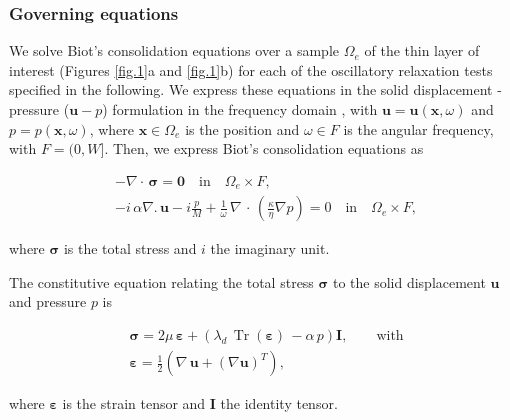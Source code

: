 \documentclass[draft]{agujournal2019}
\DeclareMathOperator{\tr}{Tr}
\begin{document}
\subsubsection{Governing equations}
We solve Biot's consolidation equations \cite{Biot1941, Biot1962} over a sample  $\Omega_e$ of the thin layer of interest (Figures \ref{fig.1}a and \ref{fig.1}b) for each of the oscillatory relaxation tests specified in the following. We express these equations in the solid displacement - pressure ($\bm{u}-p$) formulation in the frequency domain \cite{Quintal2011,Favino2020},  with $\bm{u} = \bm{u}(\bm{x}, \omega)$ and $p = p(\bm{x},\omega)$, where $\bm{x} \in \Omega_e$ is the position and $\omega \in F$ is the angular frequency, with $F =(0,W]$.
Then, we express Biot's consolidation equations as  
\begin{linenomath*}
\begin{equation}\label{Eq.6}
\begin{split}
& - \nabla \cdot \, \bm{\sigma} = \bm{0}  \quad  \textrm{in} \quad \Omega_e \times F,  \\
& - i \, \alpha \nabla . \, \bm{u} -i \frac{p}{M} + \frac{1}{\omega} \,\nabla \, \cdot \, \left( \frac{\kappa}{\eta} \nabla p\right)  =0 \quad  \textrm{in} \quad \Omega_e \times F,
\end{split}
\end{equation}
\end{linenomath*}
where $\bm{\sigma}$ is the total stress and $i$ the imaginary unit.

The constitutive equation relating the total stress $\bm{\sigma}$ to the solid displacement $\bm{u}$ and pressure $p$ is
\begin{linenomath*}
\begin{equation}\label{Eq.7}
\begin{split}
& \bm{\sigma} =  2\mu \, \bm{\varepsilon} +  \left( \lambda_d \,  \tr( \bm{\varepsilon})\, - \alpha \,p \right) \bm{I}, \qquad \text{with}\\
& \bm{\varepsilon} = \frac{1}{2} \left( \nabla \,\bm{u} + ({\nabla  \bm{u}})^T  \right),
 \end{split}
\end{equation}
\end{linenomath*}
where $\bm{\varepsilon}$ is the strain tensor and $\bm{I}$ the identity tensor. 

 
\end{document}
